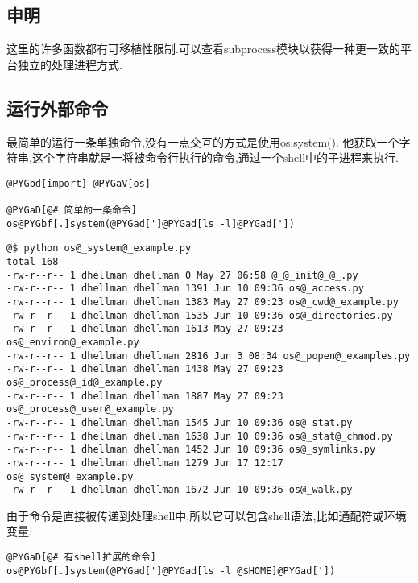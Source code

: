 \documentclass[letterpaper,10pt,english]{manual}
\begin{document}
\subsection{申明}

这里的许多函数都有可移植性限制.可以查看subprocess模块以获得一种更一致的平台独立的处理进程方式.


\subsection{运行外部命令}

最简单的运行一条单独命令,没有一点交互的方式是使用os.system(). 他获取一个字符串,这个字符串就是一将被命令行执行的命令,通过一个shell中的子进程来执行.

\begin{Verbatim}[commandchars=@\[\]]
@PYGbd[import] @PYGaV[os]

@PYGaD[@# 简单的一条命令]
os@PYGbf[.]system(@PYGad[']@PYGad[ls -l]@PYGad['])
\end{Verbatim}

\begin{Verbatim}[commandchars=@\[\]]
@$ python os@_system@_example.py
total 168
-rw-r--r-- 1 dhellman dhellman 0 May 27 06:58 @_@_init@_@_.py
-rw-r--r-- 1 dhellman dhellman 1391 Jun 10 09:36 os@_access.py
-rw-r--r-- 1 dhellman dhellman 1383 May 27 09:23 os@_cwd@_example.py
-rw-r--r-- 1 dhellman dhellman 1535 Jun 10 09:36 os@_directories.py
-rw-r--r-- 1 dhellman dhellman 1613 May 27 09:23 os@_environ@_example.py
-rw-r--r-- 1 dhellman dhellman 2816 Jun 3 08:34 os@_popen@_examples.py
-rw-r--r-- 1 dhellman dhellman 1438 May 27 09:23 os@_process@_id@_example.py
-rw-r--r-- 1 dhellman dhellman 1887 May 27 09:23 os@_process@_user@_example.py
-rw-r--r-- 1 dhellman dhellman 1545 Jun 10 09:36 os@_stat.py
-rw-r--r-- 1 dhellman dhellman 1638 Jun 10 09:36 os@_stat@_chmod.py
-rw-r--r-- 1 dhellman dhellman 1452 Jun 10 09:36 os@_symlinks.py
-rw-r--r-- 1 dhellman dhellman 1279 Jun 17 12:17 os@_system@_example.py
-rw-r--r-- 1 dhellman dhellman 1672 Jun 10 09:36 os@_walk.py
\end{Verbatim}

由于命令是直接被传递到处理shell中,所以它可以包含shell语法,比如通配符或环境变量:

\begin{Verbatim}[commandchars=@\[\]]
@PYGaD[@# 有shell扩展的命令]
os@PYGbf[.]system(@PYGad[']@PYGad[ls -l @$HOME]@PYGad['])
\end{Verbatim}
\end{document}
